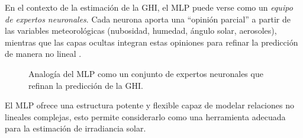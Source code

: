 En el contexto de la estimación de la GHI, el MLP puede verse como un \textit{equipo de expertos neuronales}. Cada neurona aporta una “opinión parcial” a partir de las variables meteorológicas (nubosidad, humedad, ángulo solar, aerosoles), mientras que las capas ocultas integran estas opiniones para refinar la predicción de manera no lineal \citep{torobayona2012mlp}.  

\begin{figure} 
\centering 
{}
\caption{Analogía del MLP como un conjunto de expertos neuronales que refinan la predicción de la GHI.}
\label{fig:mlp_experts}
\end{figure}

El MLP ofrece una estructura potente y flexible capaz de modelar relaciones no lineales complejas, esto permite considerarlo como una herramienta adecuada para la estimación de irradiancia solar.

